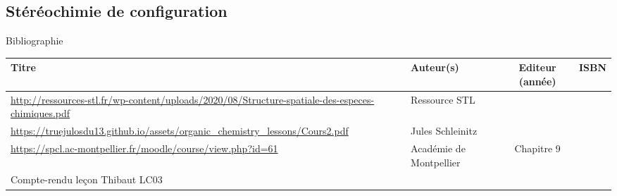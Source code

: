 \begin{headerBlock}
\chapter{Stéréochimie de configuration}
\label{LC_Stéréochimie}
 \end{headerBlock}



\begin{reportBlock}{Bibliographie}

\begin{center}
\begin{tabularx}{\textwidth}{| X | X | c | c |}\hline
Titre & Auteur(s) & Editeur (année) & ISBN \\ \hline
\url{http://ressources-stl.fr/wp-content/uploads/2020/08/Structure-spatiale-des-especes-chimiques.pdf} & Ressource STL & ~ & ~ \\
\hline
\url{https://truejulosdu13.github.io/assets/organic_chemistry_lessons/Cours2.pdf} & Jules Schleinitz &  ~ & ~ \\ \hline
 \url{https://spcl.ac-montpellier.fr/moodle/course/view.php?id=61} & Académie de Montpellier & Chapitre 9 & ~ \\ 
 \hline
 Compte-rendu leçon Thibaut LC03 & & & \\
 \hline
\end{tabularx}
\end{center}

\end{reportBlock}

